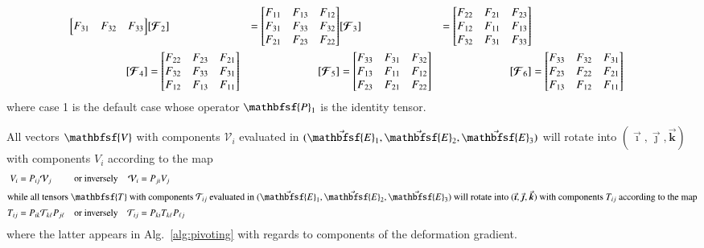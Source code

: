 \begin{subequations}
\begin{align}
\begin{bmatrix}
    F_{31} & F_{32} & F_{33}
    \end{bmatrix} & 
    [ \boldsymbol{\mathcal{F}}_2 ] & = \begin{bmatrix}
    F_{11} & F_{13} & F_{12}\\
    F_{31} & F_{33} & F_{32}\\
    F_{21} & F_{23} & F_{22}
    \end{bmatrix} &
    [ \boldsymbol{\mathcal{F}}_3 ] & = \begin{bmatrix}
    F_{22} & F_{21} & F_{23}\\
    F_{12} & F_{11} & F_{13}\\
    F_{32} & F_{31} & F_{33}
    \end{bmatrix} \notag \\
    [ \boldsymbol{\mathcal{F}}_4 ] & = \begin{bmatrix}
    F_{22} & F_{23} & F_{21}\\
    F_{32} & F_{33} & F_{31}\\
    F_{12} & F_{13} & F_{11}
    \end{bmatrix} &
    [ \boldsymbol{\mathcal{F}}_5 ] & = \begin{bmatrix}
    F_{33} & F_{31} & F_{32}\\
    F_{13} & F_{11} & F_{12}\\
    F_{23} & F_{21} & F_{22}
    \end{bmatrix} & 
    [ \boldsymbol{\mathcal{F}}_6 ] & = \begin{bmatrix}
    F_{33} & F_{32} & F_{31}\\
    F_{23} & F_{22} & F_{21}\\
    F_{13} & F_{12} & F_{11}
    \end{bmatrix}
    \end{align}
\end{subequations}
where case 1 is the default case whose operator $\mathbfsf{P}_1$ is the identity tensor.

All vectors $\mathbfsf{V}$ with components $\mathcal{V}_i$ evaluated in $( \vec{\mathbfsf{E}}_1 , \vec{\mathbfsf{E}}_2 , \vec{\mathbfsf{E}}_3 )$ will rotate into $( \vec{\boldsymbol{\imath}} , \vec{\boldsymbol{\jmath}} , \vec{\boldsymbol{k}} )$ with components $V_i$ according to the map
\begin{subequations}
    \begin{align}
    V_i & = P_{ij} \mathcal{V}_j & \text{or inversely} & &
    \mathcal{V}_i & = P_{ji} V_j \\
    \intertext{while all tensors $\mathbfsf{T}$ with components $\mathcal{T}_{ij}$ evaluated in $( \vec{\mathbfsf{E}}_1 , \vec{\mathbfsf{E}}_2 , \vec{\mathbfsf{E}}_3 )$ will rotate into $( \vec{\boldsymbol{\imath}} , \vec{\boldsymbol{\jmath}} , \vec{\boldsymbol{k}} )$ with components $T_{ij}$ according to the map}
    T_{ij} & = P_{ik} \mathcal{T}_{k\ell} P_{j\ell} & \text{or inversely} & &
    \mathcal{T}_{ij} & = P_{ki} T_{k\ell} P_{\ell j}
    \end{align}
\end{subequations}
where the latter appears in Alg.~\ref{alg:pivoting} with regards to components of the deformation gradient.

